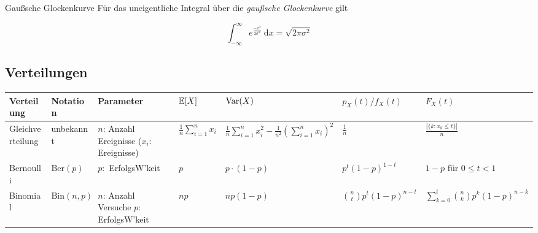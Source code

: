 \begin{subbox}{Gaußsche Glockenkurve}
  Für das uneigentliche Integral über die \textit{gaußsche Glockenkurve} gilt

  $$
    \int_{-\infty}^{\infty} e^{\frac{-x^{2}}{2 \sigma^{2}}} \mathrm{~d} x=\sqrt{2 \pi \sigma^{2}}
  $$
\end{subbox}


\clearpage

\renewcommand*{\arraystretch}{2}
\begin{center}

\subsection{Verteilungen}

  \begin{tabularx}{\textwidth}{|l|l|l|X|X|X|X|}
    \hline
    Verteilung               & Notation                                               & Parameter                                           & \( \mathbb{E}[X] \)                      & \( \text{Var}(X) \)                                             & \( p_X(t)/f_X(t) \)                                                                                                                           & \( F_X(t) \)                                                               \\
    \hline
    \hline
    Gleichverteilung & unbekannt & \makecell[l]{\( n \): Anzahl Ereignisse                                                                                                   \\ (\( x_i \): Ereignisse)} & \( \frac{1}{n} \sum_{i=1}^{n} x_i \) & \( \frac{1}{n} \sum_{i=1}^{n} x_i^2 - \frac{1}{n^2} \left(\sum_{i=1}^{n} x_i \right)^2 \) & \( \frac{1}{n} \) & \( \frac{|\{k:x_k \leq t\}|}{n} \) \\
    \hline
    Bernoulli                & $\text{Ber}(p)$                                   & \( p: \) ErfolgsW'keit                              & \( p \)                          & \( p \cdot (1-p) \)                                       & \( p^t(1-p)^{1-t} \)                                                                                                                          & \( 1-p \) für \( 0 \leq t < 1 \)                                           \\
    \hline
    Binomial & $\text{Bin}(n,p)$        & \makecell[l] {\( n \): Anzahl Versuche                                                                                                    \\ \( p: \) ErfolgsW'keit } & \( np \) & \( np(1-p) \) & \( \binom{n}{t}p^t(1-p)^{n-t} \) & \( \sum_{k=0}^{t} \binom{n}{k} p^k(1-p)^{n-k} \)  \\

\end{tabularx}
\end{center}
